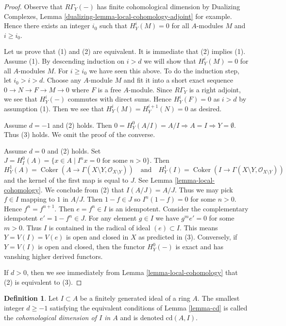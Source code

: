 \documentclass{stacks-project}
\theoremstyle{plain}
\theoremstyle{definition}
\newtheorem{definition}[subsection]{Definition}
\theoremstyle{remark}
\numberwithin{equation}{subsection}
\def\Coker{\mathop{\mathrm{Coker}}}
\begin{document}
\begin{proof}
Observe that $R\Gamma_Y(-)$ has finite cohomological dimension by
Dualizing Complexes, Lemma \ref{dualizing-lemma-local-cohomology-adjoint}
for example. Hence there exists an integer $i_0$ such that
$H^i_Y(M) = 0$ for all $A$-modules $M$ and $i \geq i_0$.

\medskip\noindent
Let us prove that (1) and (2) are equivalent. It is immediate that
(2) implies (1). Assume (1). By descending induction on $i > d$
we will show that $H^i_Y(M) = 0$ for all $A$-modules $M$.
For $i \geq i_0$ we have seen this above. To do the induction step,
let $i_0 > i > d$. Choose any $A$-module $M$ and fit it into
a short exact sequence $0 \to N \to F \to M \to 0$ where $F$ is a
free $A$-module. Since $R\Gamma_Y$ is a right adjoint, we see that
$H^i_Y(-)$ commutes with direct sums. Hence $H^i_Y(F) = 0$
as $i > d$ by assumption (1). Then we see that
$H^i_Y(M) = H^{i + 1}_Y(N) = 0$ as desired.

\medskip\noindent
Assume $d = -1$ and (2) holds. Then $0 = H^0_Y(A/I) = A/I \Rightarrow A = I
\Rightarrow Y = \emptyset$. Thus (3) holds. We omit the proof of the converse.

\medskip\noindent
Assume $d = 0$ and (2) holds. Set
$J = H^0_I(A) = \{x \in A \mid I^nx = 0 \text{ for some }n > 0\}$.
Then
$$
H^1_Y(A) = \Coker(A \to \Gamma(X \setminus Y, \mathcal{O}_{X \setminus Y}))
\quad\text{and}\quad
H^1_Y(I) = \Coker(I \to \Gamma(X \setminus Y, \mathcal{O}_{X \setminus Y}))
$$
and the kernel of the first map is equal to $J$. See
Lemma \ref{lemma-local-cohomology}.
We conclude from (2) that $I(A/J) = A/J$.
Thus we may pick $f \in I$
mapping to $1$ in $A/J$. Then $1 - f \in J$ so $I^n(1 - f) = 0$ for some
$n > 0$. Hence $f^n = f^{n + 1}$. Then $e = f^n \in I$ is an idempotent.
Consider the complementary idempotent $e' = 1 - f^n \in J$.
For any element $g \in I$ we have $g^m e' = 0$ for some $m > 0$.
Thus $I$ is contained in the radical of ideal $(e) \subset I$.
This means $Y = V(I) = V(e)$ is open and closed in $X$ as predicted in (3).
Conversely, if $Y = V(I)$ is open and closed, then the functor
$H^0_Y(-)$ is exact and has vanshing higher derived functors.

\medskip\noindent
If $d > 0$, then we see immediately from
Lemma \ref{lemma-local-cohomology} that (2) is equivalent to (3).
\end{proof}

\begin{definition}
\label{definition-cd}
Let $I \subset A$ be a finitely generated ideal of a ring $A$.
The smallest integer $d \geq -1$ satisfying the equivalent conditions
of Lemma \ref{lemma-cd} is called the
{\it cohomological dimension of $I$ in $A$} and is
denoted $\text{cd}(A, I)$.
\end{definition}
\end{document}
